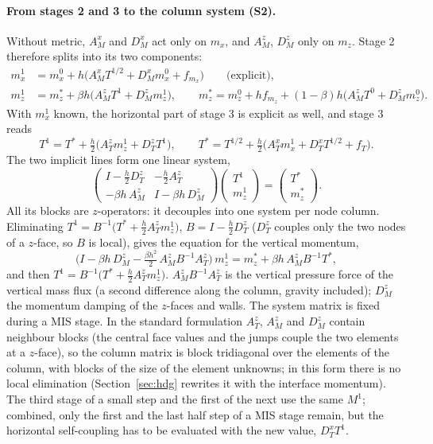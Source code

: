 \documentclass[11pt,a4paper]{article}
\begin{document}
\paragraph{From stages 2 and 3 to the column system (S2).} Without metric, $A_M^x$ and $D_M^x$ act only on $m_x$, and $A_M^z$, $D_M^z$ only on $m_z$. Stage 2
therefore splits into its two components:
\begin{align*}
m_x^1&=m_x^0+h\big(A_M^xT^{1/2}+D_M^xm_x^0+f_{m_x}\big)\qquad\text{(explicit)},\\
m_z^1&=m_z^*+\beta h\big(A_M^zT^1+D_M^zm_z^1\big),\qquad m_z^*=m_z^0+h f_{m_z}+(1-\beta)h\big(A_M^zT^0+D_M^zm_z^0\big).
\end{align*}
With $m_x^1$ known, the horizontal part of stage 3 is explicit as well, and stage 3 reads
\[
T^1=T^*+\tfrac h2\big(A_T^zm_z^1+D_T^zT^1\big),\qquad T^*=T^{1/2}+\tfrac h2\big(A_T^xm_x^1+D_T^xT^{1/2}+f_T\big).
\]
The two implicit lines form one linear system,
\[
\begin{pmatrix}I-\tfrac h2D_T^z&-\tfrac h2A_T^z\\-\beta h\,A_M^z&I-\beta h\,D_M^z\end{pmatrix}\begin{pmatrix}T^1\\m_z^1\end{pmatrix}=\begin{pmatrix}T^*\\m_z^*\end{pmatrix}.
\]
All its blocks are $z$-operators: it decouples into one system per node column. Eliminating $T^1=B^{-1}\big(T^*+\tfrac h2A_T^zm_z^1\big)$, $B=I-\tfrac h2D_T^z$
($D_T^z$ couples only the two nodes of a $z$-face, so $B$ is local), gives the equation for the vertical momentum,
\[
\Big(I-\beta h\,D_M^z-\tfrac{\beta h^2}{2}\,A_M^zB^{-1}A_T^z\Big)\,m_z^1=m_z^*+\beta h\,A_M^zB^{-1}T^*,
\]
and then $T^1=B^{-1}\big(T^*+\tfrac h2A_T^zm_z^1\big)$. $A_M^zB^{-1}A_T^z$ is the vertical pressure force of the vertical mass flux (a second
difference along the column, gravity included); $D_M^z$ the momentum damping of the $z$-faces and walls. The system matrix is fixed during a
MIS stage. In the standard formulation $A_T^z$, $A_M^z$ and $D_M^z$ contain neighbour blocks (the central face values and the jumps couple the
two elements at a $z$-face), so the column matrix is block tridiagonal over the elements of the column, with blocks of the size of the
element unknowns; in this form there is no local elimination (Section~\ref{sec:hdg} rewrites it with the interface momentum).
The third stage of a small step and the first of the next use the same $M^1$; combined, only the first and the last half step of a MIS stage
remain, but the horizontal self-coupling has to be evaluated with the new value, $D_T^xT^1$.
\end{document}
